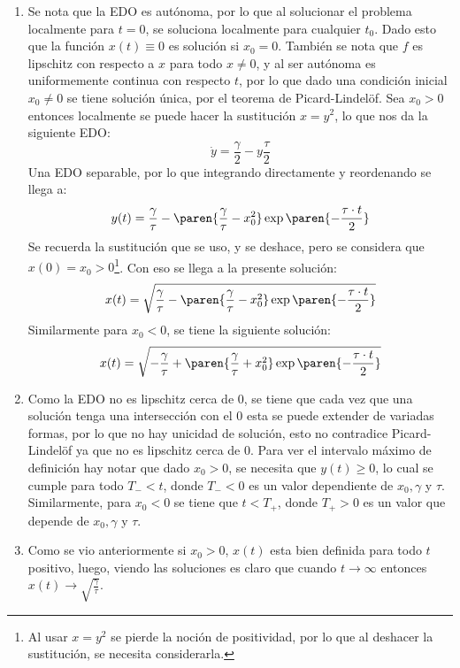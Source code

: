 \documentclass{homework}
\begin{document}
\begin{sol}
    \begin{enumerate}
        \item Se nota que la EDO es autónoma, por lo que al solucionar el problema localmente para \(t=0\), se soluciona localmente para cualquier \(t_0\). Dado esto que la función \(x(t)\equiv0\) es solución si \(x_0=0\). También se nota que \(f\) es lipschitz con respecto a \(x\) para todo \(x\neq0\), y al ser autónoma es uniformemente continua con respecto \(t\), por lo que dado una condición inicial \(x_0\neq0\) se tiene solución única, por el teorema de Picard-Lindelöf. Sea \(x_0>0\) entonces localmente se puede hacer la sustitución \(x=y^2\), lo que nos da la siguiente EDO:
        \begin{equation*}
            \dot{y}=\frac\gamma2-y\frac\tau2 
        \end{equation*}
        Una EDO separable, por lo que integrando directamente y reordenando se llega a:
        \begin{equation*}
            y(t)=\frac\gamma\tau-\paren{\frac\gamma\tau-x_0^2}\exp\paren{-\frac{\tau\cdot t}2}
        \end{equation*}
        Se recuerda la sustitución que se uso, y se deshace, pero se considera que \(x(0)=x_0>0\)\footnote{Al usar \(x=y^2\) se pierde la noción de positividad, por lo que al deshacer la sustitución, se necesita considerarla.}. Con eso se llega a la presente solución:
        \begin{equation*}
            x(t)=\sqrt{\frac\gamma\tau-\paren{\frac\gamma\tau-x_0^2}\exp\paren{-\frac{\tau\cdot t}2}}
        \end{equation*}
        Similarmente para \(x_0<0\), se tiene la siguiente solución:\begin{equation*}
            x(t)=\sqrt{-\frac\gamma\tau+\paren{\frac\gamma\tau+x_0^2}\exp\paren{-\frac{\tau\cdot t}2}}
        \end{equation*}
        \item Como la EDO no es lipschitz cerca de \(0\), se tiene que cada vez que una solución tenga una intersección con el \(0\) esta se puede extender de variadas formas, por lo que no hay unicidad de solución, esto no contradice Picard-Lindelöf ya que no es lipschitz cerca de \(0\). Para ver el intervalo máximo de definición hay notar que dado \(x_0>0\), se necesita que \(y(t)\geq0\), lo cual se cumple para todo \(T_-<t\), donde \(T_-<0\) es un valor dependiente de \(x_0,\gamma\) y \(\tau\). Similarmente, para \(x_0<0\) se tiene que \(t<T_+\), donde \(T_+>0\) es un valor que depende de \(x_0,\gamma\) y \(\tau\).
        \item Como se vio anteriormente si \(x_0>0\), \(x(t)\) esta bien definida para todo \(t\) positivo, luego, viendo las soluciones es claro que cuando \(t\rightarrow\infty\) entonces \(x(t)\rightarrow\sqrt{\frac\gamma\tau}\).
    \end{enumerate}
\end{sol}
\end{document}
